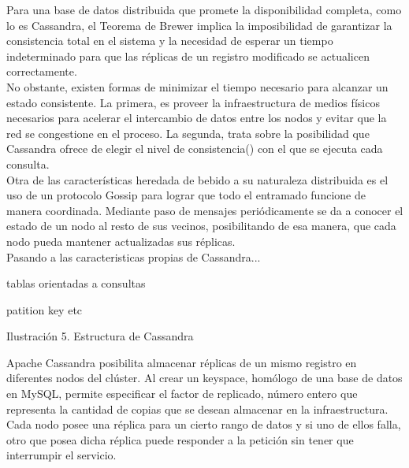 Para una base de datos distribuida que promete la disponibilidad completa, como lo es Cassandra, el Teorema de Brewer implica la imposibilidad de garantizar la consistencia total en el sistema y la necesidad de esperar un tiempo indeterminado para que las réplicas de un registro modificado se actualicen correctamente.\\

No obstante, existen formas de minimizar el tiempo necesario para alcanzar un estado consistente. La primera, es proveer la infraestructura de medios físicos necesarios para acelerar el intercambio de datos entre los nodos y evitar que la red se congestione en el proceso. La segunda, trata sobre la posibilidad que Cassandra ofrece de elegir el nivel de consistencia() con el que se ejecuta cada consulta.\\

Otra de las características heredada de bebido a su naturaleza distribuida es el uso de un protocolo Gossip para lograr que todo el entramado funcione de manera coordinada. Mediante paso de mensajes periódicamente se da a conocer el estado de un nodo al resto de sus vecinos, posibilitando de esa manera, que cada nodo pueda mantener actualizadas sus réplicas.\\

Pasando a las caracteristicas propias de Cassandra...


tablas orientadas a consultas

patition key etc

Ilustración 5. Estructura de Cassandra

Apache Cassandra posibilita almacenar réplicas de un mismo registro en diferentes nodos del clúster. Al crear un keyspace, homólogo de una base de datos en MySQL, permite especificar el factor de replicado, número entero que representa la cantidad de copias que se desean almacenar en la infraestructura. Cada nodo posee una réplica para un cierto rango de datos y si uno de ellos falla, otro que posea dicha réplica puede responder a la petición sin tener que interrumpir el servicio.\\ 

